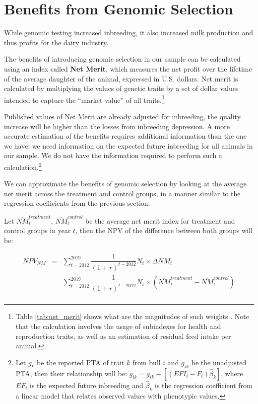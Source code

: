 \documentclass[12pt,letterpaper]{article}
\begin{document}
\section{Benefits from Genomic Selection\label{sec:benefit}} 
While genomic testing increased inbreeding, it also increased milk production and thus profits for the dairy industry.

The benefits of introducing genomic selection in our sample can be calculated using an index called \textbf{Net Merit}, which measures the net profit over the lifetime of the average daughter of the animal, expressed in U.S. dollars. Net merit is calculated by multiplying the values of genetic traits by a set of dollar values intended to capture the ``market value'' of all traits.\footnote{Table \ref{tab:net_merit} shows what are the magnitudes of such weights \citep{VanRaden2021}. Note that the calculation involves the usage of subindexes for health and reproduction traits, as well as an estimation of residual feed intake per animal.}

Published values of Net Merit are already adjusted for inbreeding, the quality increase will be higher than the losses from inbreeding depression. A more accurate estimation of the benefits requires additional information than the one we have; we need information on the expected future inbreeding for all animals in our sample. We do not have the information required to perform such a calculation.\footnote{Let $g_{k}$ be the reported PTA of trait $k$ from bull $i$ and $\tilde{g}_{ik}$ be the unadjusted PTA, then their relationship will be: $\tilde{g}_{ik}=g_{ik}-\left[(EFI_{i}-F_{i})\hat{\beta}_{k}\right]$, where $EF_{i}$ is the expected future inbreeding and $\hat{\beta}_{k}$ is the regression coefficient from a linear model that relates observed values with phenotypic values.} 

We can approximate the benefits of genomic selection by looking at the average net merit across the treatment and control groups, in a manner similar to the regression coefficients from the previous section.

Let $\overline{NM}^{treatment}_{t}$, $\overline{NM}^{control}_{t}$ be the average net merit index for treatment and control groups in year $t$, then the NPV of the difference between both groups will be:

\begin{eqnarray*}
NPV_{NM} &=& \sum_{t = 2012}^{2019}\dfrac{1}{(1+r)^{t-2012}}N_{t}\times \Delta NM_{t}\\
&=& \sum_{t = 2012}^{2019}\dfrac{1}{(1+r)^{t-2012}}N_{t}\times\left( \overline{NM}^{treatment}_{t}-\overline{NM}^{control}_{t}\right)\\
\end{eqnarray*}
\end{document}

